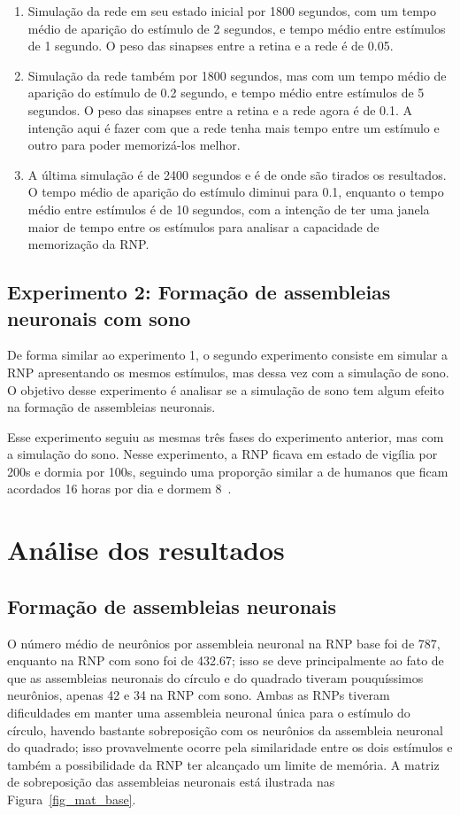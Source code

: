 \begin{enumerate}
  \item Simulação da rede em seu estado inicial por 1800 segundos, com um tempo médio de aparição do estímulo de 2 segundos, e
  tempo médio entre estímulos de 1 segundo. O peso das sinapses entre a retina e a rede é de 0.05.
  \item Simulação da rede também por 1800 segundos, mas com um tempo médio de aparição do estímulo de 0.2 segundo, e
  tempo médio entre estímulos de 5 segundos. O peso das sinapses entre a retina e a rede agora é de 0.1. A intenção aqui é
  fazer com que a rede tenha mais tempo entre um estímulo e outro para poder memorizá-los melhor.
  \item A última simulação é de 2400 segundos e é de onde são tirados os resultados. O tempo médio de aparição do estímulo diminui
  para 0.1, enquanto o tempo médio entre estímulos é de 10 segundos, com a intenção de ter uma janela maior de tempo entre os
  estímulos para analisar a capacidade de memorização da RNP.
\end{enumerate}


\subsection{Experimento 2: Formação de assembleias neuronais com sono}

De forma similar ao experimento 1, o segundo experimento consiste em simular a RNP apresentando os mesmos estímulos, mas dessa vez
com a simulação de sono. O objetivo desse experimento é analisar se a simulação de sono tem algum efeito na formação de
assembleias neuronais.

Esse experimento seguiu as mesmas três fases do experimento anterior, mas com a simulação do sono. Nesse experimento, a RNP ficava
em estado de vigília por 200s e dormia por 100s, seguindo uma proporção similar a de humanos que ficam acordados 16 horas por dia
e dormem 8~\cite{waterhouseDaily2012}.

\section{Análise dos resultados}

\subsection{Formação de assembleias neuronais}

O número médio de neurônios por assembleia neuronal na RNP base foi de 787, enquanto na RNP com sono foi de 432.67; isso se deve
principalmente ao fato de que as assembleias neuronais do círculo e do quadrado tiveram pouquíssimos neurônios, apenas 42 e 34 na
RNP com sono. Ambas as RNPs tiveram dificuldades em manter uma assembleia neuronal única para o estímulo do círculo, havendo
bastante sobreposição com os neurônios da assembleia neuronal do quadrado; isso provavelmente ocorre pela similaridade entre os
dois estímulos e também a possibilidade da RNP ter alcançado um limite de memória. A matriz de sobreposição das assembleias
neuronais está ilustrada nas Figura~\ref{fig_mat_base}.

